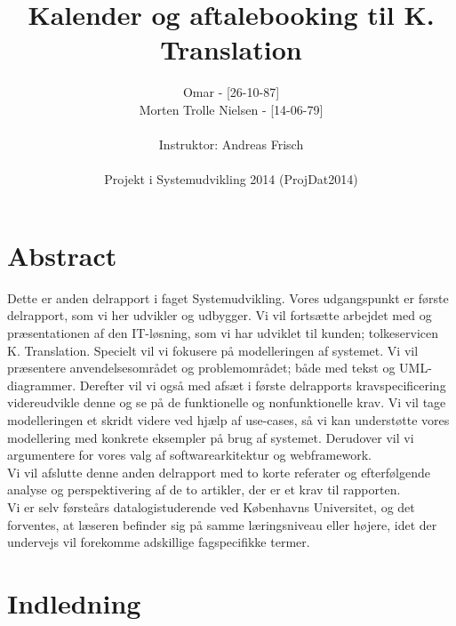 \documentclass[12pt]{article}   %
\title{Kalender og aftalebooking til K. Translation}
\author{Omar - [26-10-87]\\
     Morten Trolle Nielsen - [14-06-79]\\ \\
    Instruktor: Andreas Frisch\\ \\
Projekt i Systemudvikling 2014 (ProjDat2014)}
\begin{document}
\maketitle
\thispagestyle{empty}
\newpage
\tableofcontents
\newpage

\section{Abstract}
Dette er anden delrapport i faget Systemudvikling. Vores udgangspunkt er første
delrapport, som vi her udvikler og udbygger. Vi vil fortsætte arbejdet med og
præsentationen af den IT-løsning, som vi har udviklet til kunden; tolkeservicen
K. Translation. Specielt vil vi fokusere på modelleringen af systemet. Vi vil 
præsentere anvendelsesområdet og problemområdet; både med tekst og UML-diagrammer.
Derefter vil vi også med afsæt i første delrapports kravspecificering videreudvikle
denne og se på de funktionelle og nonfunktionelle krav. Vi vil tage modelleringen
et skridt videre ved hjælp af use-cases, så vi kan understøtte vores modellering med
konkrete eksempler på brug af systemet. Derudover vil vi argumentere for vores
valg af softwarearkitektur og webframework. \\
Vi vil afslutte denne anden delrapport med to korte referater og efterfølgende
analyse og perspektivering af de to artikler, der er et krav til rapporten.\\
Vi er selv førsteårs datalogistuderende ved Københavns Universitet, og det
forventes, at læseren befinder sig på samme læringsniveau eller højere, idet
der undervejs vil forekomme adskillige fagspecifikke termer. 

\newpage

\section{Indledning}
\end{document}
